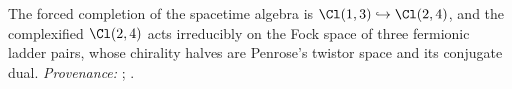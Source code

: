 The forced completion of the spacetime algebra is $\Cl(1,3) \hookrightarrow \Cl(2,4)$, and the complexified $\Cl(2,4)$ acts irreducibly on the Fock space of three fermionic ladder pairs, whose chirality halves are Penrose's twistor space and its conjugate dual. \emph{Provenance:} \cite[Thms.~4.2 and 4.13]{ButlerT1}; \cite[Thms.~3.1 and 3.4]{ButlerT9}.
